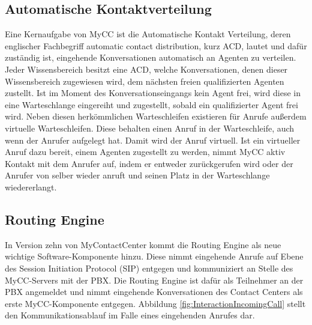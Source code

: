 \newpage

\subsection{Automatische Kontaktverteilung}
\label{subsec:Automatische Kontaktverteilung}
Eine Kernaufgabe von MyCC ist die Automatische Kontakt Verteilung, deren englischer Fachbegriff automatic contact distribution, kurz ACD, lautet und dafür zuständig ist, eingehende Konversationen automatisch an Agenten zu verteilen. Jeder Wissensbereich besitzt eine ACD, welche Konversationen, denen dieser Wissensbereich zugewiesen wird, dem nächsten freien qualifizierten Agenten zustellt. Ist im Moment des Konversationseingangs kein Agent frei, wird diese in eine Warteschlange eingereiht und zugestellt, sobald ein qualifizierter Agent frei wird. Neben diesen herkömmlichen Warteschleifen existieren für Anrufe außerdem virtuelle Warteschleifen. Diese behalten einen Anruf in der Warteschleife, auch wenn der Anrufer aufgelegt hat. Damit wird der Anruf virtuell. Ist ein virtueller Anruf dazu bereit, einem Agenten zugestellt zu werden, nimmt MyCC aktiv Kontakt mit dem Anrufer auf, indem er entweder zurückgerufen wird oder der Anrufer von selber wieder anruft und seinen Platz in der Warteschlange wiedererlangt.

\subsection{Routing Engine}
\label{subsec:Routing Engine}
In Version zehn von MyContactCenter kommt die Routing Engine als neue wichtige Software-Komponente hinzu. Diese nimmt eingehende Anrufe auf Ebene des Session Initiation Protocol (SIP) entgegen und kommuniziert an Stelle des MyCC-Servers mit der PBX. Die Routing Engine ist dafür als Teilnehmer an der PBX angemeldet und nimmt eingehende Konversationen des Contact Centers als erste MyCC-Komponente entgegen. Abbildung \ref{fig:InteractionIncomingCall} stellt den Kommunikationsablauf im Falle eines eingehenden Anrufes dar. 

